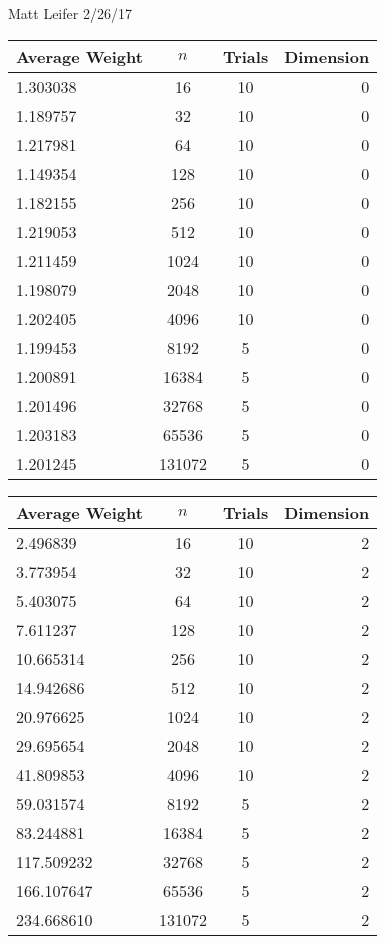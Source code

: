 \documentclass{article}
\begin{document}
	
\noindent Matt Leifer \hspace{5.5in} 2/26/17\\

\begin{tabular} {l | c | c| r}
	Average Weight & $n$ & Trials & Dimension \\
	\hline 
	1.303038 & 16 & 10 & 0 \\ 
	1.189757 & 32 & 10 & 0 \\ 
	1.217981 & 64 & 10 & 0 \\ 
	1.149354 & 128 & 10 & 0 \\ 
	1.182155 & 256 & 10 & 0 \\ 
	1.219053 & 512 & 10 & 0 \\ 
	1.211459 & 1024 & 10 & 0 \\ 
	1.198079 & 2048 & 10 & 0 \\ 
	1.202405 & 4096 & 10 & 0 \\ 
	1.199453 & 8192 & 5 & 0 \\ 
	1.200891 & 16384 & 5 & 0 \\ 
	1.201496 & 32768 & 5 & 0 \\ 
	1.203183 & 65536 & 5 & 0 \\
	1.201245 & 131072 & 5 & 0 \\
\end{tabular}

\begin{tabular} {l | c | c| r}
	Average Weight & $n$ & Trials & Dimension \\
	\hline 
	2.496839 & 16 & 10 & 2 \\ 
	3.773954 & 32 & 10 & 2 \\ 
	5.403075 & 64 & 10 & 2 \\ 
	7.611237 & 128 & 10 & 2 \\ 
	10.665314 & 256 & 10 & 2 \\ 
	14.942686 & 512 & 10 & 2 \\ 
	20.976625 & 1024 & 10 & 2 \\ 
	29.695654 & 2048 & 10 & 2 \\ 
	41.809853 & 4096 & 10 & 2 \\ 
	59.031574 & 8192 & 5 & 2 \\ 
	83.244881 & 16384 & 5 & 2 \\ 
	117.509232 & 32768 & 5 & 2 \\ 
	166.107647 & 65536 & 5 & 2 \\
	234.668610 & 131072 & 5 & 2 \\
\end{tabular}
\end{document}
